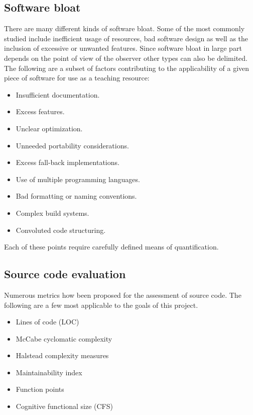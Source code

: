 \subsection{Software bloat}

There are many different kinds of software bloat. Some of the most commonly studied include inefficient usage of resources, bad software design as well as the inclusion of excessive or unwanted features. Since software bloat in large part depends on the point of view of the observer other types can also be delimited. The following are a subset of factors contributing to the applicability of a given piece of software for use as a teaching resource:

\begin{itemize}
    \item Insufficient documentation.
    \item Excess features.
    \item Unclear optimization.
    \item Unneeded portability considerations.
    \item Excess fall-back implementations.
    \item Use of multiple programming languages.
    \item Bad formatting or naming conventions.
    \item Complex build systems.
    \item Convoluted code structuring.
\end{itemize}

Each of these points require carefully defined means of quantification.

\subsection{Source code evaluation}

Numerous metrics how been proposed for the assessment of source code.
The following are a few most applicable to the goals of this project.

\begin{itemize}
    \item Lines of code (LOC)
    \item McCabe cyclomatic complexity
    \item Halstead complexity measures
    \item Maintainability index
    \item Function points
    \item Cognitive functional size (CFS)
\end{itemize}

